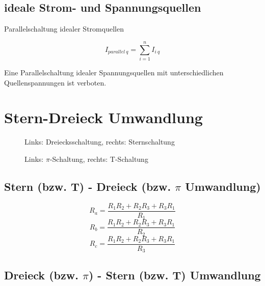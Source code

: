 \documentclass[german, 10pt, a4paper, headsepline]{scrreprt}
\theoremstyle{remark}
\begin{document}
\subsection{ideale Strom- und Spannungsquellen}

Parallelschaltung idealer Stromquellen

\begin{displaymath}
	I_{parallel\: q}=\sum^n_{i=1}I_{i\: q}
\end{displaymath}

Eine Parallelschaltung idealer Spannungsquellen mit unterschiedlichen Quellenspannungen ist verboten.

\section{Stern-Dreieck Umwandlung}


\begin{figure}[hbt]
 
 \centerline{\box\graph}
 \caption{Links: Dreiecksschaltung, rechts: Sternschaltung}
 \label{stern_dreieck}
\end{figure}

\begin{figure}[hbt]
 
 \centerline{\box\graph}
 \caption{Links: $\pi$-Schaltung, rechts: T-Schaltung}
 \label{stern_dreieck2}
\end{figure}

\subsection{Stern (bzw. T) - Dreieck (bzw. $\pi$ Umwandlung)}

\begin{displaymath}
	R_a = \frac{R_1R_2+R_2R_3+R_3R_1}{R_1}
\end{displaymath}
\begin{displaymath}
	R_b = \frac{R_1R_2+R_2R_3+R_3R_1}{R_2}
\end{displaymath}
\begin{displaymath}
	R_c = \frac{R_1R_2+R_2R_3+R_3R_1}{R_3}
\end{displaymath}

\subsection{Dreieck (bzw. $\pi$) - Stern (bzw. T) Umwandlung}
\end{document}
